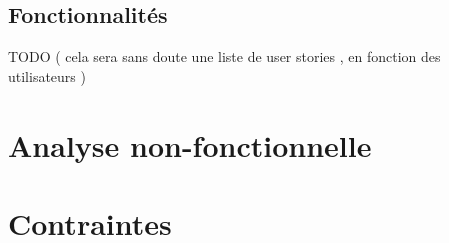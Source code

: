 \subsection*{Fonctionnalités}

TODO ( cela sera sans doute une liste de user stories , en fonction des utilisateurs )





\section{Analyse non-fonctionnelle}

\section {Contraintes}
